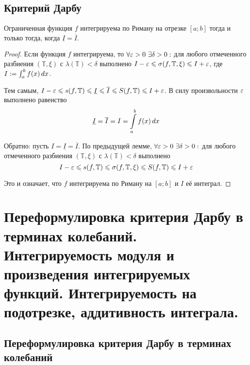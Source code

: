 \documentclass[a4paper]{article}
\theoremstyle{named}
\newcommand{\T}{\mathbb{T}}
\renewcommand{\int}{\intop}
\begin{document}
        \subsection{Критерий Дарбу}

        \begin{theorem*}
            Ограниченная функция $f$ интегрируема по Риману на отрезке $[a; b]$ тогда и только тогда, когда $\underline{I} = \overline{I}$.
        \end{theorem*}

        \begin{proof}
            Если функция $f$ интегрируема, то $\forall \eps > 0 \ \exists \delta > 0:$ для любого отмеченного разбиения $(\T, \xi)$ с $\lambda(\T) < \delta$ выполнено $I - \eps \leq \sigma(f, \T, \xi) \leq I + \eps$, где $I := \int_a^b f(x) \dd x$.

            Тем самым, $I - \eps \leq s(f, \T) \leq \underline{I} \leq \overline{I} \leq S(f, \T) \leq I + \eps$. В силу произвольности $\varepsilon$ выполнено равенство
            \begin{equation*}
                \underline{I} = \overline{I} = I = \int_a^b f(x) \dd x
            \end{equation*}

            Обратно: пусть $I = \underline{I} = \overline{I}$. По предыдущей лемме, $\forall \eps > 0 \ \exists \delta > 0:$ для любого отмеченного разбиения $(\T, \xi)$ с $\lambda(\T) < \delta$ выполнено
            \begin{equation*}
                I - \eps \leq s(f, \T) \leq \sigma(f, \T, \xi) \leq S(f, \T) \leq I + \eps
            \end{equation*}

            Это и означает, что $f$ интегрируема по Риману на $[a; b]$ и $I$ её интеграл.
        \end{proof}

    \section{Переформулировка критерия Дарбу в терминах колебаний. Интегрируемость модуля и произведения интегрируемых функций. Интегрируемость на подотрезке, аддитивность интеграла.}

        \subsection{Переформулировка критерия Дарбу в терминах колебаний}
\end{document}
